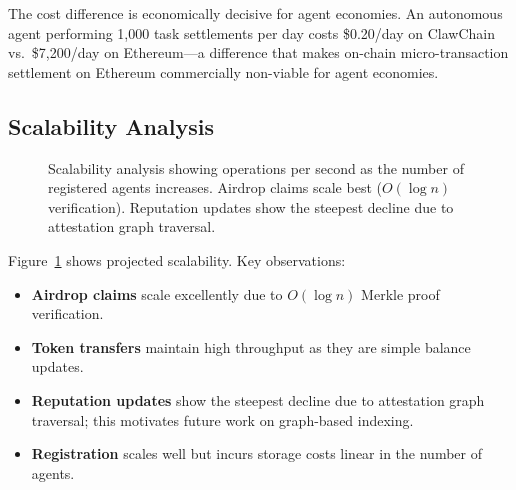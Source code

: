 \documentclass[conference]{IEEEtran}
\begin{document}
The cost difference is economically decisive for agent economies. An autonomous agent performing 1,000 task settlements per day costs \$0.20/day on ClawChain vs.\ \$7,200/day on Ethereum---a difference that makes on-chain micro-transaction settlement on Ethereum commercially non-viable for agent economies.

\subsection{Scalability Analysis}

\begin{figure}[t]
\centering
{}
\caption{Scalability analysis showing operations per second as the number of registered agents increases. Airdrop claims scale best ($O(\log n)$ verification). Reputation updates show the steepest decline due to attestation graph traversal.}
\label{fig:scalability}
\end{figure}

Figure~\ref{fig:scalability} shows projected scalability. Key observations:
\begin{itemize}
    \item \textbf{Airdrop claims} scale excellently due to $O(\log n)$ Merkle proof verification.
    \item \textbf{Token transfers} maintain high throughput as they are simple balance updates.
    \item \textbf{Reputation updates} show the steepest decline due to attestation graph traversal; this motivates future work on graph-based indexing.
    \item \textbf{Registration} scales well but incurs storage costs linear in the number of agents.
\end{itemize}
\end{document}
